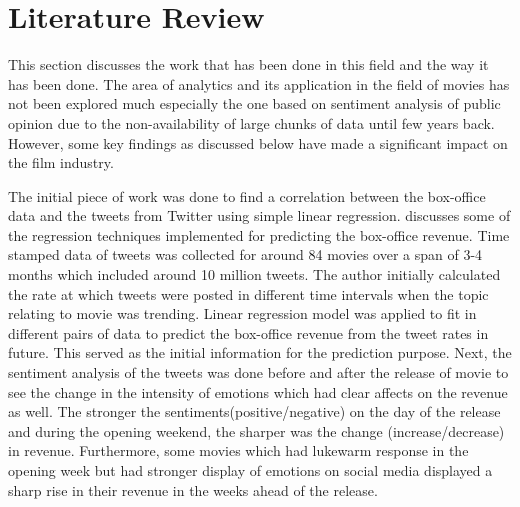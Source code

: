 \section{Literature Review}
\vspace{-0.1in}
This section discusses the work that has been done in this field and the way it has been done. The area of analytics and its application in the field of movies has not been explored much especially the one based on sentiment analysis of public opinion due to the non-availability of large chunks of data until few years back. However, some key findings as discussed below have made a significant impact on the film industry.

The initial piece of work was done to find a correlation between the box-office data and the tweets from Twitter using simple linear regression. \citet{asur2010predicting} discusses some of the regression techniques implemented for predicting the box-office revenue. Time stamped data of tweets was collected for around 84 movies over a span of 3-4 months which included around 10 million tweets. The author initially calculated the rate at which tweets were posted in different time intervals when the topic relating to movie was trending. Linear regression model was applied to fit in different pairs of data to predict the box-office revenue from the tweet rates in future. This served as the initial information for the prediction purpose. Next, the sentiment analysis of the tweets was done before and after the release of movie to see the change in the intensity of emotions which had clear affects on the revenue as well. The stronger the sentiments(positive/negative) on the day of the release and during the opening weekend, the sharper was the change (increase/decrease) in revenue. Furthermore, some movies which had lukewarm response in the opening week but had stronger display of emotions on social media displayed a sharp rise in their revenue in the weeks ahead of the release. 

